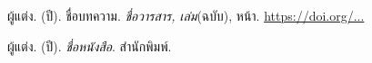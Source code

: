 \documentclass{aick-thai-preprint}
\begin{document}

\begin{AICKReferences}
\item ผู้แต่ง. (ปี). ชื่อบทความ. \textit{ชื่อวารสาร, เล่ม}(ฉบับ), หน้า. \url{https://doi.org/...}
\item ผู้แต่ง. (ปี). \textit{ชื่อหนังสือ}. สำนักพิมพ์.
\end{AICKReferences}
\end{document}
